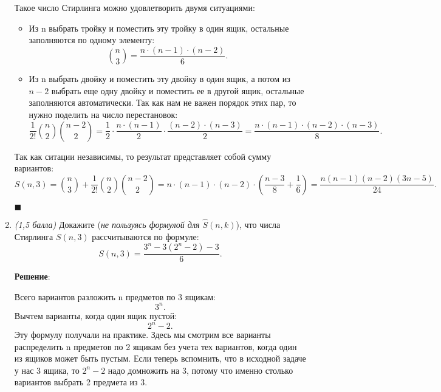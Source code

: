 \documentclass{article}
\begin{document}
\begin{enumerate}
    Такое число Стирлинга можно удовлетворить двумя ситуациями:
    \begin{itemize}
        \item Из n выбрать тройку и поместить эту тройку в один ящик, остальные заполняются по одному элементу:
        \begin{equation}
            \binom{n}{3} = \frac{n \cdot (n-1) \cdot (n-2)}{6}.
        \end{equation}
        \item Из n выбрать двойку и поместить эту двойку в один ящик, а потом из $n-2$ выбрать еще одну двойку и поместить ее в другой ящик, остальные заполняются автоматически. Так как нам не важен порядок этих пар, то нужно поделить на число перестановок:
        \begin{equation}
            \frac{1}{2!}\binom{n}{2}\binom{n-2}{2} = \frac{1}{2}\cdot\frac{n \cdot (n-1)}{2} \cdot \frac{(n-2) \cdot (n-3)}{2} = \frac{n \cdot (n-1)\cdot(n-2) \cdot (n-3)}{8}.
        \end{equation}
    \end{itemize}
    Так как ситации независимы, то результат представляет собой сумму вариантов:
    \begin{equation}
        S(n,3) = \binom{n}{3} + \frac{1}{2!}\binom{n}{2}\binom{n-2}{2} = n \cdot (n-1) \cdot (n-2) \cdot \left(\frac{n-3}{8} + \frac{1}{6}\right) = \frac{n(n-1)(n-2)(3n-5)}{24}.
    \end{equation}


    \begin{flushright}
        $\blacksquare$
    \end{flushright}

    
    \item \textit{(1,5 балла)} Докажите (\textit{не пользуясь формулой для $\hat{S}(n,k)$}), что числа Стирлинга $S(n,3)$ рассчитываются по формуле:
    $$S(n,3)=\frac{3^n-3(2^n-2)-3}{6}.$$

    
    \textbf{Решение}:

    Всего вариантов разложить n предметов по 3 ящикам:
    \begin{equation}
        3^n.
    \end{equation}
    Вычтем варианты, когда один ящик пустой:
    \begin{equation}
        2^n - 2.
    \end{equation}
    Эту формулу получали на практике. Здесь мы смотрим все варианты распределить n предметов по 2 ящикам без учета тех вариантов, когда один из ящиков может быть пустым. Если теперь вспомнить, что в исходной задаче у нас 3 ящика, то $2^n - 2$ надо домножить на 3, потому что именно столько вариантов выбрать 2 предмета из 3.


\end{enumerate}
\end{document}
